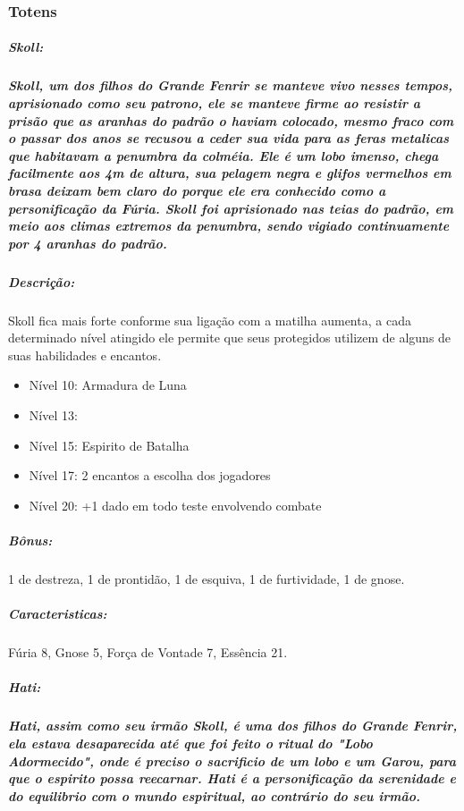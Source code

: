 \subsubsection{\bf Totens}
\subparagraph{\bf Skoll:} 
\subparagraph*{Skoll, um dos filhos do Grande Fenrir se manteve vivo nesses tempos, aprisionado como seu patrono, ele se manteve firme ao resistir a prisão que as aranhas do padrão o haviam colocado, mesmo fraco com o passar dos anos se recusou a ceder sua vida para as feras metalicas que habitavam a penumbra da colméia.
Ele é um lobo imenso, chega facilmente aos 4m de altura, sua pelagem negra e glifos vermelhos em brasa deixam bem claro do porque ele era conhecido como a personificação da Fúria.
Skoll foi aprisionado nas teias do padrão, em meio aos climas extremos da penumbra, sendo vigiado continuamente por 4 aranhas do padrão.}

\subparagraph*{\bf Descrição:} Skoll fica mais forte conforme sua ligação com a matilha aumenta, a cada determinado nível atingido ele permite que seus protegidos utilizem de alguns de suas habilidades e encantos.
\begin{itemize}
    \item Nível 10: Armadura de Luna
    \item Nível 13:
    \item Nível 15: Espirito de Batalha
    \item Nível 17: 2 encantos a escolha dos jogadores
    \item Nível 20: +1 dado em todo teste envolvendo combate
\end{itemize}
\subparagraph*{\bf Bônus:} 1 de destreza, 1 de prontidão, 1 de esquiva, 1 de furtividade, 1 de gnose.
\subparagraph*{\bf Caracteristicas:}
Fúria 8, Gnose 5, Força de Vontade 7, Essência 21.

\subparagraph{\bf Hati:} 
\subparagraph*{Hati, assim como seu irmão Skoll, é uma dos filhos do Grande Fenrir, ela estava desaparecida até que foi feito o ritual do "Lobo Adormecido", onde é preciso o sacrificio de um lobo e um Garou, para que o espirito possa reecarnar. Hati é a personificação da serenidade e do equilibrio com o mundo espiritual, ao contrário do seu irmão.}